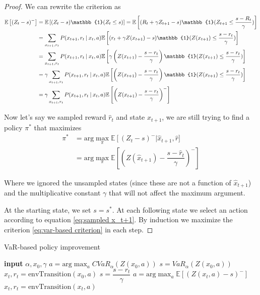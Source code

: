 \begin{proof}
We can rewrite the criterion as
\begin{equation}
\begin{split}
\mathbb{E}\left[(Z_t-s)^-\right] &= \mathbb{E}\left[(Z_t-s)\mathbb{1}(Z_t\le s)\right] = \mathbb{E}\left[(R_t + \gamma Z_{t+1}-s)\mathbb{1}(Z_{t+1}\le \dfrac{s - R_t}{\gamma})\right]\\
&= \sum_{x_{t+1}, r_t} P(x_{t+1}, r_t \given x_t, a)\mathbb{E}\left[(r_t + \gamma Z(x_{t+1})-s)\mathbb{1}(Z(x_{t+1})\le \dfrac{s - r_t}{\gamma})\right]\\
&= \sum_{x_{t+1}, r_t} P(x_{t+1}, r_t \given x_t, a)\mathbb{E}\left[\gamma\left(Z(x_{t+1})-\dfrac{s-r_t}{\gamma}\right)\mathbb{1}(Z(x_{t+1})\le \dfrac{s - r_t}{\gamma})\right]\\
&= \gamma\sum_{x_{t+1}, r_t} P(x_{t+1}, r_t \given x_t, a)\mathbb{E}\left[\left(Z(x_{t+1})-\dfrac{s-r_t}{\gamma}\right)\mathbb{1}(Z(x_{t+1})\le \dfrac{s - r_t}{\gamma})\right]\\
&= \gamma\sum_{x_{t+1}, r_t} P(x_{t+1}, r_t \given x_t, a)\mathbb{E}\left[\left(Z(x_{t+1}) - \dfrac{s - r_t}{\gamma}\right)^-\right]
\end{split}
\end{equation}


Now let's say we sampled reward $\hat{r}_t$ and state $\hat{x}_{t+1}$, we are still trying to find a policy $\pi^*$ that maximizes 
\begin{equation}\label{eq:sampled x_t+1}
\begin{split}
\pi^* &=\text{arg}\max_\pi \mathbb{E}\left[(Z_t-s)^-\right | \hat{x}_{t+1}, \hat{r}]\\
&= \text{arg}\max_\pi \mathbb{E}\left[\left(Z(\hat{x}_{t+1}) - \dfrac{s - \hat{r}_t}{\gamma}\right)^-\right]
\end{split}
\end{equation}

Where we ignored the unsampled states (since these are not a function of $\hat{x}_{t+1}$) and the multiplicative constant $\gamma$ that will not affect the maximum argument.

At the starting state, we set $s=s^*$. At each following state we select an action according to equation \ref{eq:sampled x_t+1}. By induction we maximize the criterion \ref{eq:var-based criterion} in each step.
\end{proof}

\begin{algorithm}
\caption{VaR-based policy improvement}
\label{alg:var}
\begin{algorithmic}
    \STATE \textbf{input} $\alpha, x_0, \gamma$
    \STATE $a = \text{arg}\max_a CVaR_\alpha(Z(x_0, a))$
    \STATE $s = VaR_\alpha(Z(x_0, a))$
    \STATE $x_t, r_t = \text{envTransition}(x_0, a)$
    	\STATE $s = \dfrac{s-r_t}{\gamma}$
    	\STATE $a = \text{arg}\max_a \mathbb{E}\left[(Z(x_t, a)-s)^- \right]$
    	\STATE $x_t, r_t = \text{envTransition}(x_t, a)$
   	\ENDWHILE
\end{algorithmic}
\end{algorithm}

